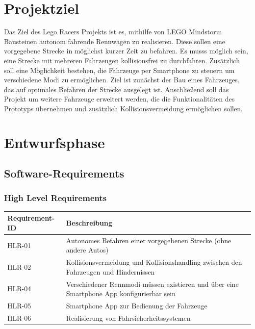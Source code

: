 \documentclass[a4paper,12pt]{article}                                         %
\def\myType{0}
\numberwithin{table}{section}                               %
\numberwithin{figure}{section}                              %
\begin{document}
	\ifcase\myType
		
	\or
		
	\or
		
	\else
	\fi
	
	\pagestyle{fancy}
	
	
	

	\pagestyle{fancy}
	\fancyhead[L]{\nouppercase{\leftmark}}
		
	
	\section{Projektziel}
	Das Ziel des Lego Racers Projekts ist es, mithilfe von LEGO Mindstorm Bausteinen autonom fahrende Rennwagen zu realisieren. Diese sollen eine vorgegebene Strecke in möglichst kurzer Zeit zu befahren. Es musss möglich sein, eine Strecke mit mehreren Fahrzeugen kollisionsfrei zu durchfahren. Zusätzlich soll eine Möglichkeit bestehen, die Fahrzeuge per Smartphone zu steuern um verschiedene Modi zu ermöglichen. Ziel ist zunächst der Bau eines Fahrzeuges, das auf optimales Befahren der Strecke ausgelegt ist. Anschließend soll das Projekt um weitere Fahrzeuge erweitert werden, die die Funktionalitäten des Prototyps übernehmen und zusätzlich Kollisionsvermeidung ermöglichen sollen.
	
	\newpage
	
	\section{Entwurfsphase}
	\subsection{Software-Requirements}\label{kap:reqs}
	\subsubsection{High Level Requirements}
	
	\begin{tabular}{ l | p{} }
	\textbf{Requirement-ID} & \textbf{Beschreibung} \\ \hline
	HLR-01 & 
	Autonomes Befahren einer vorgegebenen Strecke (ohne andere Autos)
	\\
	HLR-02 &
	Kollisionsvermeidung und Kollisionshandling zwischen den Fahrzeugen und Hindernissen \\
	HLR-04 &
	Verschiedener Rennmodi müssen existieren und über eine Smartphone App konfigurierbar sein \\	
	HLR-05 &
	Smartphone App zur Bedienung der Fahrzeuge\\
	HLR-06 &
	Realisierung von Fahrsicherheitssystemen\\
	\end{tabular}
    
\end{document}
